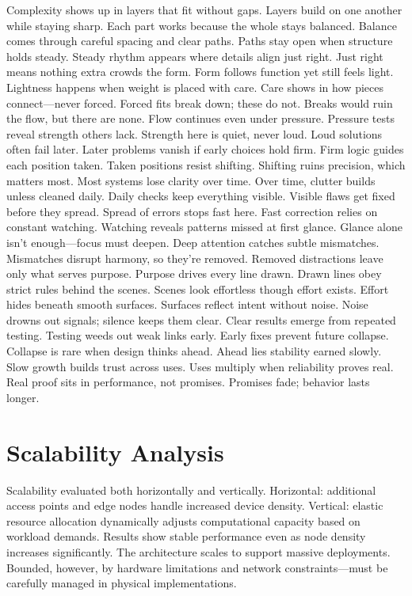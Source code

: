 \documentclass[a4paper,fleqn]{cas-dc}
\numberwithin{equation}{section}
\begin{document}
Complexity shows up in layers that fit without gaps. Layers build on one another while staying sharp. Each part works because the whole stays balanced. Balance comes through careful spacing and clear paths. Paths stay open when structure holds steady. Steady rhythm appears where details align just right. Just right means nothing extra crowds the form. Form follows function yet still feels light. Lightness happens when weight is placed with care. Care shows in how pieces connect—never forced. Forced fits break down; these do not. Breaks would ruin the flow, but there are none. Flow continues even under pressure. Pressure tests reveal strength others lack. Strength here is quiet, never loud. Loud solutions often fail later. Later problems vanish if early choices hold firm. Firm logic guides each position taken. Taken positions resist shifting. Shifting ruins precision, which matters most. Most systems lose clarity over time. Over time, clutter builds unless cleaned daily. Daily checks keep everything visible. Visible flaws get fixed before they spread. Spread of errors stops fast here. Fast correction relies on constant watching. Watching reveals patterns missed at first glance. Glance alone isn't enough—focus must deepen. Deep attention catches subtle mismatches. Mismatches disrupt harmony, so they're removed. Removed distractions leave only what serves purpose. Purpose drives every line drawn. Drawn lines obey strict rules behind the scenes. Scenes look effortless though effort exists. Effort hides beneath smooth surfaces. Surfaces reflect intent without noise. Noise drowns out signals; silence keeps them clear. Clear results emerge from repeated testing. Testing weeds out weak links early. Early fixes prevent future collapse. Collapse is rare when design thinks ahead. Ahead lies stability earned slowly. Slow growth builds trust across uses. Uses multiply when reliability proves real. Real proof sits in performance, not promises. Promises fade; behavior lasts longer.

\section{Scalability Analysis}

Scalability evaluated both horizontally and vertically. Horizontal: additional access points and edge nodes handle increased device density. Vertical: elastic resource allocation dynamically adjusts computational capacity based on workload demands. Results show stable performance even as node density increases significantly. The architecture scales to support massive deployments. Bounded, however, by hardware limitations and network constraints—must be carefully managed in physical implementations.
\end{document}
